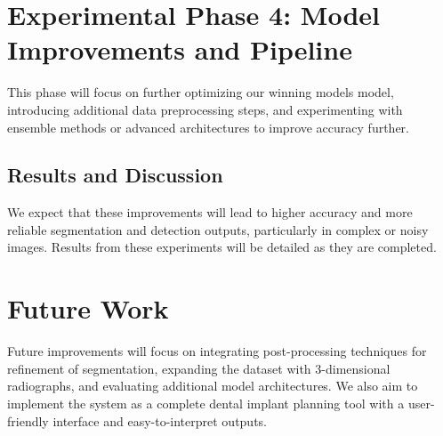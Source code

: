 \documentclass[12pt]{article}
\begin{document}
\newpage

\section{Experimental Phase 4: Model Improvements and Pipeline}
This phase will focus on further optimizing our winning models model, introducing additional data preprocessing steps, and experimenting with ensemble methods or advanced architectures to improve accuracy further.

\subsection{Results and Discussion}
We expect that these improvements will lead to higher accuracy and more reliable segmentation and detection outputs, particularly in complex or noisy images. Results from these experiments will be detailed as they are completed.

\section{Future Work}
Future improvements will focus on integrating post-processing techniques for refinement of segmentation, expanding the dataset with 3-dimensional radiographs, and evaluating additional model architectures. We also aim to implement the system as a complete dental implant planning tool with a user-friendly interface and easy-to-interpret outputs.
\end{document}
